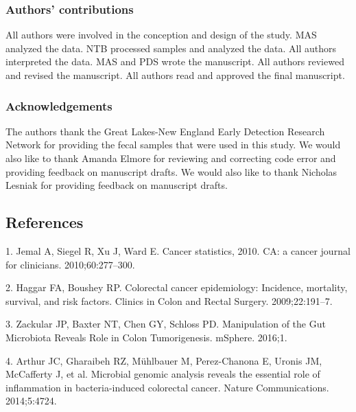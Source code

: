 \documentclass[12pt,]{article}
\begin{document}
\subsubsection{Authors' contributions}\label{authors-contributions}

All authors were involved in the conception and design of the study. MAS
analyzed the data. NTB processed samples and analyzed the data. All
authors interpreted the data. MAS and PDS wrote the manuscript. All
authors reviewed and revised the manuscript. All authors read and
approved the final manuscript.

\subsubsection{Acknowledgements}\label{acknowledgements}

The authors thank the Great Lakes-New England Early Detection Research
Network for providing the fecal samples that were used in this study. We
would also like to thank Amanda Elmore for reviewing and correcting code
error and providing feedback on manuscript drafts. We would also like to
thank Nicholas Lesniak for providing feedback on manuscript drafts.

\newpage

\subsection*{References}\label{references}

\hypertarget{refs}{}
\hypertarget{ref-jemal_cancer_2010}{}
1. Jemal A, Siegel R, Xu J, Ward E. Cancer statistics, 2010. CA: a
cancer journal for clinicians. 2010;60:277--300.

\hypertarget{ref-haggar_colorectal_2009}{}
2. Haggar FA, Boushey RP. Colorectal cancer epidemiology: Incidence,
mortality, survival, and risk factors. Clinics in Colon and Rectal
Surgery. 2009;22:191--7.

\hypertarget{ref-zackular_manipulation_2016}{}
3. Zackular JP, Baxter NT, Chen GY, Schloss PD. Manipulation of the Gut
Microbiota Reveals Role in Colon Tumorigenesis. mSphere. 2016;1.

\hypertarget{ref-arthur_microbial_2014}{}
4. Arthur JC, Gharaibeh RZ, Mühlbauer M, Perez-Chanona E, Uronis JM,
McCafferty J, et al. Microbial genomic analysis reveals the essential
role of inflammation in bacteria-induced colorectal cancer. Nature
Communications. 2014;5:4724.
\end{document}
